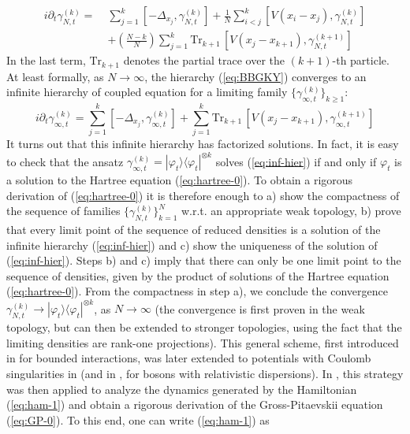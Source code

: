 \documentclass[11pt,a4paper,DIV11]{scrartcl}	%
\newcommand{\tr}{\mbox{Tr}}
\begin{document}
\begin{equation}\label{eq:BBGKY} \begin{split}
i\partial_t \gamma^{(k)}_{N,t} = \; & \sum_{j=1}^k \left[-\Delta_{x_j} , \gamma^{(k)}_{N,t} \right]  + \frac{1}{N} \sum_{i<j}^k \left[ V(x_i - x_j) , \gamma^{(k)}_{N,t} \right] \\ &+\left( \frac{N-k}{N} \right) \sum_{j=1}^k \tr_{k+1} \, \left[ V(x_j - x_{k+1}) , \gamma^{(k+1)}_{N,t} \right] 
\end{split}\end{equation}
In the last term, $\tr_{k+1}$ denotes the partial trace over the $(k+1)$-th particle. At least formally, as $N \to \infty$, the hierarchy (\ref{eq:BBGKY}) converges to an infinite hierarchy of coupled equation for a limiting family $\{ \gamma_{\infty,t}^{(k)} \}_{k \geq 1}$:
\begin{equation}
\label{eq:inf-hier}
i\partial_t \gamma^{(k)}_{\infty,t} =  \sum_{j=1}^k \left[-\Delta_{x_j} , \gamma^{(k)}_{\infty,t} \right]  + \sum_{j=1}^k \tr_{k+1} \, \left[ V(x_j - x_{k+1}) , \gamma^{(k+1)}_{\infty,t} \right] 
\end{equation}
It turns out that this infinite hierarchy has factorized solutions. In fact, it is easy to check that the ansatz $\gamma^{(k)}_{\infty,t} = |\varphi_t \rangle \langle \varphi_t|^{\otimes k}$ solves (\ref{eq:inf-hier}) if and only if $\varphi_t$ is a solution to the Hartree equation (\ref{eq:hartree-0}). To obtain a rigorous derivation of (\ref{eq:hartree-0}) it is therefore enough to a) show the compactness of the sequence of families $\{ \gamma_{N,t}^{(k)} \}_{k=1}^N$ w.r.t. an appropriate weak topology, b) prove that every limit point of the sequence of reduced densities is a solution of the infinite hierarchy (\ref{eq:inf-hier}) and c) show the uniqueness of the solution of (\ref{eq:inf-hier}). Steps b) and c) imply that there can only be one limit point to the sequence of densities, given by the product of solutions of the Hartree equation (\ref{eq:hartree-0}). {F}rom the compactness in step a), we conclude the convergence $\gamma^{(k)}_{N,t} \to |\varphi_t \rangle \langle \varphi_t|^{\otimes k}$, as $N \to \infty$ (the convergence is first proven in the weak topology, but can then be extended to stronger topologies, using the fact that the limiting densities are rank-one projections). This general scheme, first introduced in \cite{S} for bounded interactions, was later extended to potentials with Coulomb singularities in \cite{EY} (and in \cite{ES}, for bosons with relativistic dispersions). In \cite{ESY1,ESY2,ESY3,ESY4}, this strategy was then applied to analyze the dynamics generated by the Hamiltonian (\ref{eq:ham-1}) and obtain a rigorous derivation of the Gross-Pitaevskii equation (\ref{eq:GP-0}). To this end, one can write (\ref{eq:ham-1}) as
\end{document}
